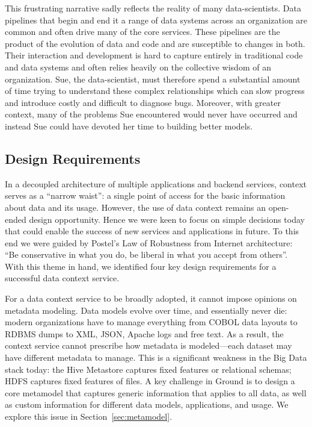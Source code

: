 \documentclass{sig-alternate}
\begin{document}
This frustrating narrative sadly reflects the reality of many data-scientists.  
Data pipelines that begin and end it a range of data systems across an organization are common and often drive many of the core services. 
These pipelines are the product of the evolution of data and code and are susceptible to changes in both.  
Their interaction and development is hard to capture entirely in traditional code and data systems and often relies heavily on the collective wisdom of an organization.
Sue, the data-scientist, must therefore spend a substantial amount of time trying to understand these complex relationships which can slow progress and introduce costly and difficult to diagnose bugs. 
Moreover, with greater context, many of the problems Sue encountered would never have occurred and instead Sue could have devoted her time to building better models.   







\subsection{Design Requirements}
In a decoupled architecture of multiple applications and backend services, context serves as a ``narrow waist'': a single point of access for the basic information about data and its usage. However, the use of data context remains an open-ended design opportunity. Hence we were keen to focus on simple decisions today that could enable the success of new services and applications in future. To this end we were guided by Postel's Law of Robustness from Internet architecture: ``Be conservative in what you do, be liberal in what you accept from others''.  With this theme in hand, we identified four key design requirements for a successful data context service.

 For a data context service to be broadly adopted, it cannot impose opinions on metadata modeling. Data models evolve over time, and essentially never die: modern organizations have to manage everything from COBOL data layouts to RDBMS dumps to XML, JSON, Apache logs and free text. As a result, the context service cannot prescribe how metadata is modeled---each dataset may have different metadata to manage. This is a significant weakness in the Big Data stack today: the Hive Metastore captures fixed features or relational schemas; HDFS captures fixed features of files.  A key challenge in Ground is to design a core metamodel that captures generic information that applies to all data, as well as custom information for different data models, applications, and usage. We explore this issue in Section~\ref{sec:metamodel}.
\end{document}
